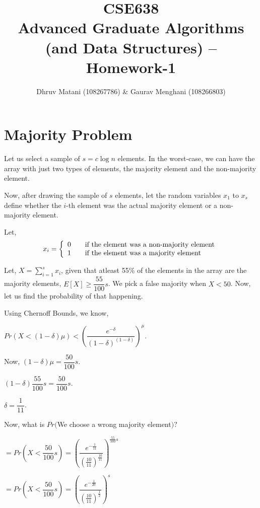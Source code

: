 \documentclass{article}
\title{CSE638 \\ Advanced Graduate Algorithms (and Data Structures) -- Homework-1}
\author{Dhruv Matani (108267786) \& Gaurav Menghani (108266803)}
\begin{document}
\maketitle

\clearpage

\tableofcontents

\clearpage


\section{Majority Problem}
Let us select a sample of $s = c\log{n}$ elements. In the worst-case, we can
have the array with just two types of elements, the majority element and the
non-majority element.

Now, after drawing the sample of $s$ elements, let the random variables
$x_{1}$ to $x_{s}$ define whether the $i$-th element was the actual majority
element or a non-majority element.

Let, \[
  x_{i} = \left\{
  \begin{array}{l l}
    0 & \quad \text{if the element was a non-majority element}\\
    1 & \quad \text{if the element was a majority element}\\
  \end{array}
  \right.
\]

Let, $X = \displaystyle\sum\limits_{i=1}^s{x_{i}}$,
given that atleast 55\% of the elements in the array are the majority elements,
$E[X] \geq \dfrac{55}{100}s$. We pick a false majority when $X < 50$. Now,
let us find the probability of that happening.

Using Chernoff Bounds, we know,

$Pr(X < (1-\delta)\mu) < \left(\dfrac{e^{-\delta}}{(1-\delta)^{(1-\delta)}}\right)^\mu$.

Now, $(1-\delta)\mu = \dfrac{50}{100}s$.

$(1-\delta)\dfrac{55}{100}s = \dfrac{50}{100}s$.

$\delta = \dfrac{1}{11}$.

Now, what is $Pr($We choose a wrong majority element$)?$

$ = Pr(X < \dfrac{50}{100}s) = \left(\dfrac{e^{-\frac{1}{11}}}{(\frac{10}{11})^{\frac{10}{11}}}\right)^{\frac{55}{100}s}$

$ = Pr(X < \dfrac{50}{100}s) = \left(\dfrac{e^{-\frac{1}{20}}}{(\frac{10}{11})^{\frac{1}{2}}}\right)^s$
\end{document}
